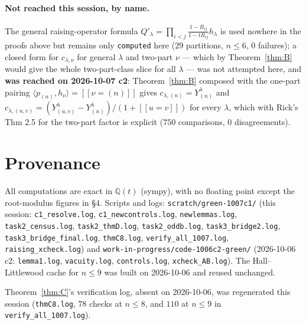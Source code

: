 \documentclass[11pt]{article}
\theoremstyle{plain}
\theoremstyle{definition}
\newcommand{\QQ}{\mathbb{Q}}
\newcommand{\Qp}{Q'}
\newcommand{\lam}{\lambda}
\newcommand{\lb}{[\![}
\newcommand{\rb}{]\!]}
\begin{document}
\paragraph{Not reached this session, by name.} The general raising-operator formula
$\Qp_\lam=\prod_{i<j}\frac{1-R_{ij}}{1-tR_{ij}}h_\lam$ is used nowhere in the proofs above but
remains only \texttt{computed} here ($29$ partitions, $n\le 6$, $0$ failures); a closed form for
$c_{\lam,\nu}$ for general $\lam$ and two-part $\nu$ --- which by Theorem~\ref{thm:B} would give
the whole two-part-class slice for all $\lam$ --- was not attempted here, and \textbf{was reached
on 2026-10-07 c2}: Theorem~\ref{thm:B} composed with the one-part pairing
$\langle p_{(n)},h_\nu\rangle=\lb\nu=(n)\rb$ gives $c_{\lam,(n)}=Y^\lam_{(n)}$ and
$c_{\lam,(u,v)}=(Y^\lam_{(u,v)}-Y^\lam_{(n)})/(1+\lb u=v\rb)$ for every $\lam$, which with Rick's
Thm 2.5 for the two-part factor is explicit ($750$ comparisons, $0$ disagreements).

\section*{Provenance}

All computations are exact in $\QQ(t)$ (sympy), with no floating point except the root-modulus
figures in \S4. Scripts and logs: \texttt{scratch/green-1007c1/} (this session:
\texttt{c1\_resolve.log}, \texttt{c1\_newcontrols.log}, \texttt{newlemmas.log},
\texttt{task2\_census.log}, \texttt{task2\_thmD.log}, \texttt{task2\_oddb.log},
\texttt{task3\_bridge2.log}, \texttt{task3\_bridge\_final.log}, \texttt{thmC8.log},
\texttt{verify\_all\_1007.log}, \texttt{raising\_xcheck.log}) and
\texttt{work-in-progress/code-1006c2-green/} (2026-10-06 c2: \texttt{lemma1.log},
\texttt{vacuity.log}, \texttt{controls.log}, \texttt{xcheck\_AB.log}). The Hall--Littlewood cache
for $n\le 9$ was built on 2026-10-06 and reused unchanged.

Theorem~\ref{thm:C}'s verification log, absent on 2026-10-06, was regenerated this session
(\texttt{thmC8.log}, $78$ checks at $n\le 8$, and $110$ at $n\le 9$ in
\texttt{verify\_all\_1007.log}).
\end{document}
